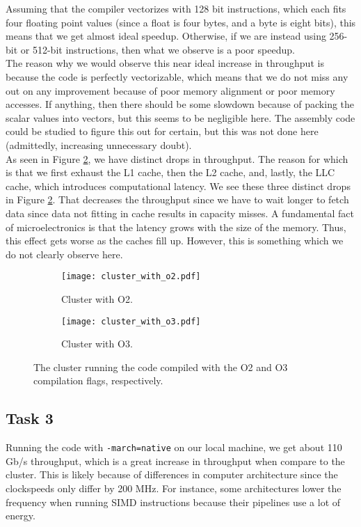 \documentclass[10pt]{article}
\begin{document}
Assuming that the compiler vectorizes with 128 bit instructions, which each fits four floating point values (since a float is four bytes, and a byte is eight bits), this means that we get almost ideal speedup. Otherwise, if we are instead using 256-bit or 512-bit instructions, then what we observe is a poor speedup. \\

The reason why we would observe this near ideal increase in throughput is because the code is perfectly vectorizable, which means that we do not miss any out on any improvement because of poor memory alignment or poor memory accesses. If anything, then there should be some slowdown because of packing the scalar values into vectors, but this seems to be negligible here. The assembly code could be studied to figure this out for certain, but this was not done here (admittedly, increasing unnecessary doubt). \\

As seen in Figure \ref{fig:cluster_with_o3}, we have distinct drops in throughput. The reason for which is that we first exhaust the L1 cache, then the L2 cache, and, lastly, the LLC cache, which introduces computational latency. We see these three distinct drops in Figure \ref{fig:cluster_with_o3}. That decreases the throughput since we have to wait longer to fetch data since data not fitting in cache results in capacity misses. A fundamental fact of microelectronics is that the latency grows with the size of the memory. Thus, this effect gets worse as the caches fill up. However, this is something which we do not clearly observe here.
\begin{figure}[H]
    \centering
    \begin{subfigure}[b]{0.49\textwidth}
        \centering
        \texttt{[image: cluster\_with\_o2.pdf]}
        \caption{Cluster with O2.}
        \label{fig:cluster_with_o2}
    \end{subfigure}\hfill
    \begin{subfigure}[b]{0.49\textwidth}
        \centering
        \texttt{[image: cluster\_with\_o3.pdf]}
        \caption{Cluster with O3.}
        \label{fig:cluster_with_o3}
    \end{subfigure}\hfill
    \caption{The cluster running the code compiled with the O2 and O3 compilation flags, respectively.}
    \label{fig:flags}
\end{figure}
\subsection{Task 3}
Running the code with \texttt{-march=native} on our local machine, we get about 110 Gb/s throughput, which is a great increase in throughput when compare to the cluster. This is likely because of differences in computer architecture since the clockspeeds only differ by 200 MHz. For instance, some architectures lower the frequency when running SIMD instructions because their pipelines use a lot of energy. \\
\end{document}
